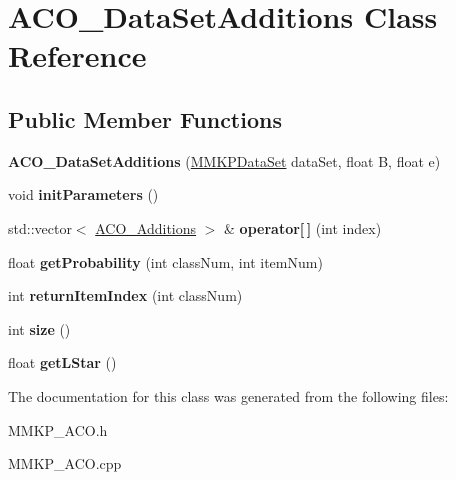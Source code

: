 \hypertarget{class_a_c_o___data_set_additions}{\section{A\+C\+O\+\_\+\+Data\+Set\+Additions Class Reference}
\label{class_a_c_o___data_set_additions}
}
\subsection*{Public Member Functions}
\begin{DoxyCompactItemize}
\item 
\hypertarget{class_a_c_o___data_set_additions_a65bc5fa2a5dfe8c3446e7bf665925884}{{\bfseries A\+C\+O\+\_\+\+Data\+Set\+Additions} (\hyperlink{class_m_m_k_p_data_set}{M\+M\+K\+P\+Data\+Set} data\+Set, float B, float e)}\label{class_a_c_o___data_set_additions_a65bc5fa2a5dfe8c3446e7bf665925884}

\item 
\hypertarget{class_a_c_o___data_set_additions_acb4683b5e0e2c1637a0d0f209f0e009f}{void {\bfseries init\+Parameters} ()}\label{class_a_c_o___data_set_additions_acb4683b5e0e2c1637a0d0f209f0e009f}

\item 
\hypertarget{class_a_c_o___data_set_additions_a855bf4c428538e512ce2840e2f37f0e5}{std\+::vector$<$ \hyperlink{structaco__additions}{A\+C\+O\+\_\+\+Additions} $>$ \& {\bfseries operator\mbox{[}$\,$\mbox{]}} (int index)}\label{class_a_c_o___data_set_additions_a855bf4c428538e512ce2840e2f37f0e5}

\item 
\hypertarget{class_a_c_o___data_set_additions_aa271743dc8b4ecf7f6a4dae809004e44}{float {\bfseries get\+Probability} (int class\+Num, int item\+Num)}\label{class_a_c_o___data_set_additions_aa271743dc8b4ecf7f6a4dae809004e44}

\item 
\hypertarget{class_a_c_o___data_set_additions_af37d18439c4e8aaf238f508eb34ae5d3}{int {\bfseries return\+Item\+Index} (int class\+Num)}\label{class_a_c_o___data_set_additions_af37d18439c4e8aaf238f508eb34ae5d3}

\item 
\hypertarget{class_a_c_o___data_set_additions_a932f50ad94604db8bf4a1de5c4aed71b}{int {\bfseries size} ()}\label{class_a_c_o___data_set_additions_a932f50ad94604db8bf4a1de5c4aed71b}

\item 
\hypertarget{class_a_c_o___data_set_additions_afc02c443ea03a0a759238b5419905d8a}{float {\bfseries get\+L\+Star} ()}\label{class_a_c_o___data_set_additions_afc02c443ea03a0a759238b5419905d8a}

\end{DoxyCompactItemize}


The documentation for this class was generated from the following files\+:\begin{DoxyCompactItemize}
\item 
M\+M\+K\+P\+\_\+\+A\+C\+O.\+h\item 
M\+M\+K\+P\+\_\+\+A\+C\+O.\+cpp\end{DoxyCompactItemize}
